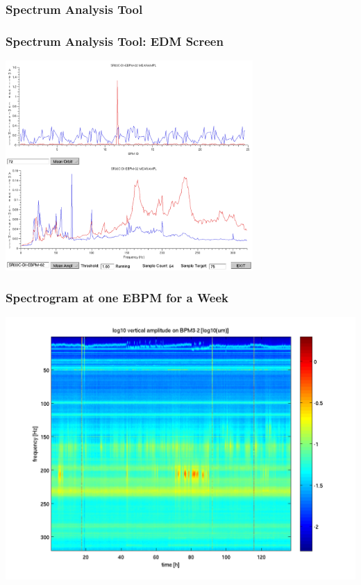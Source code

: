 \documentclass{beamer}
\begin{document}
\begin{frame}\frametitle{Spectrum Analysis Tool}
\begin{center}

\end{center}
\end{frame}


\begin{frame}\frametitle{Spectrum Analysis Tool: EDM Screen}
\begin{center}
\includegraphics[height=80mm]{spectrum}
\end{center}
\end{frame}


\begin{frame}\frametitle{Spectrogram at one EBPM for a Week}
\includegraphics[width=\linewidth]{spectrogram-3-2}
\end{frame}
\end{document}
